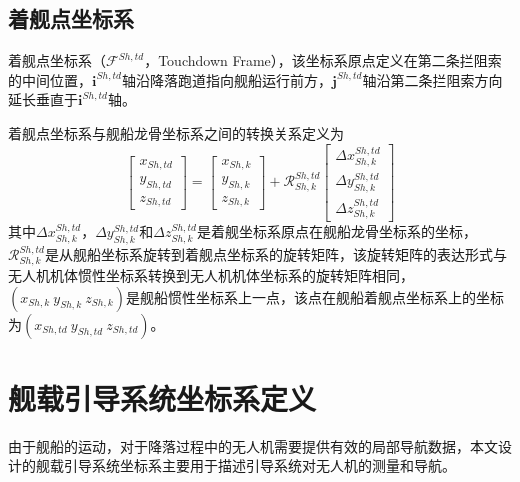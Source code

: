 \subsection{着舰点坐标系}
着舰点坐标系（$\mathcal{F}^{Sh,td}$，Touchdown Frame），该坐标系原点定义在第二条拦阻索的中间位置，$\mathbf{i}^{Sh,td}$轴沿降落跑道指向舰船运行前方，$\mathbf{j}^{Sh,td}$轴沿第二条拦阻索方向延长垂直于$\mathbf{i}^{Sh,td}$轴。

着舰点坐标系与舰船龙骨坐标系之间的转换关系定义为
\begin{equation}
\begin{bmatrix} x_{Sh,td} \\ y_{Sh,td} \\z_{Sh,td} \end{bmatrix} = \begin{bmatrix} x_{Sh,k} \\ y_{Sh,k} \\z_{Sh,k} \end{bmatrix} +\mathcal{R}_{Sh,k}^{Sh,td} \begin{bmatrix} \Delta x_{Sh,k}^{Sh,td} \\ \Delta y_{Sh,k}^{Sh,td} \\ \Delta z_{Sh,k}^{Sh,td} 
\end{bmatrix}
\end{equation}
其中$\Delta x_{Sh,k}^{Sh,td}$，$\Delta y_{Sh,k}^{Sh,td}$和$\Delta z_{Sh,k}^{Sh,td}$是着舰坐标系原点在舰船龙骨坐标系的坐标，$\mathcal{R}_{Sh,k}^{Sh,td}$是从舰船坐标系旋转到着舰点坐标系的旋转矩阵，该旋转矩阵的表达形式与无人机机体惯性坐标系转换到无人机机体坐标系的旋转矩阵相同，$(x_{Sh,k}\ y_{Sh,k}\ z_{Sh,k})$是舰船惯性坐标系上一点，该点在舰船着舰点坐标系上的坐标为$(x_{Sh,td}\ y_{Sh,td}\ z_{Sh,td})$。

\section{舰载引导系统坐标系定义}
由于舰船的运动，对于降落过程中的无人机需要提供有效的局部导航数据，本文设计的舰载引导系统坐标系主要用于描述引导系统对无人机的测量和导航。
